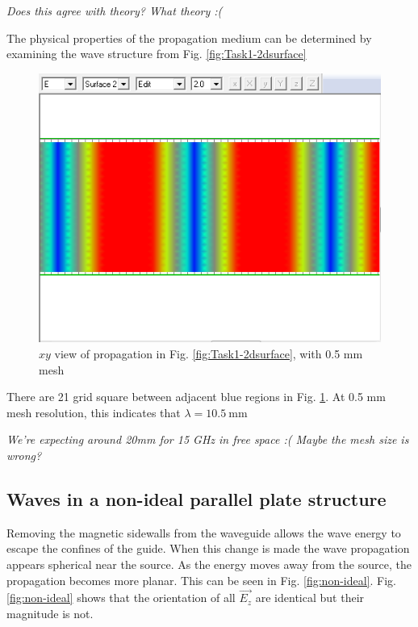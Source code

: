 \emph{Does this agree with theory? What theory :(}

The physical properties of the propagation medium can be determined by examining the wave structure from Fig. \ref{fig:Task1-2dsurface}

\begin{figure}[tbph]
	\centering
	\includegraphics[width=0.7\linewidth]{graphics/Task1-scale}
	\caption{$xy$ view of propagation in Fig. \ref{fig:Task1-2dsurface}, with 0.5 mm mesh}
	\label{fig:Task1-scale}
\end{figure}

There are 21 grid square between adjacent blue regions in Fig. \ref{fig:Task1-scale}.
At 0.5 mm mesh resolution, this indicates that $\lambda = \SI{10.5}{\milli\meter}$

\emph{We're expecting around 20mm for 15 GHz in free space :( Maybe the mesh size is wrong?}

\subsection{Waves in a non-ideal parallel plate structure}\label{sec:non-ideal}
Removing the magnetic sidewalls from the waveguide allows the wave energy to escape the confines of the guide.
When this change is made the wave propagation appears spherical near the source.
As the energy moves away from the source, the propagation becomes more planar.
This can be seen in Fig. \ref{fig:non-ideal}.
Fig. \ref{fig:non-ideal} shows that the orientation of all $\vec{E_z}$ are identical but their magnitude is not.

